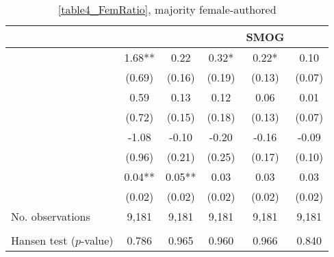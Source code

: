 \begin{table}
    \footnotesize
    \centering
    \begin{threeparttable}
        \caption{\autoref{table4_FemRatio}, majority female-authored}
        \label{table4_Fem50}
        \begin{tabular}{p{4cm}S@{}S@{}S@{}S@{}S@{}}
            \toprule
            &{}&{}&{}&{SMOG}&{}\\
            \midrule
            &        1.68** &        0.22   &        0.32*  &        0.22*  &        0.10   \\
                                          &      (0.69)   &      (0.16)   &      (0.19)   &      (0.13)   &      (0.07)   \\
            &        0.59   &        0.13   &        0.12   &        0.06   &        0.01   \\
                                          &      (0.72)   &      (0.15)   &      (0.18)   &      (0.13)   &      (0.07)   \\
            &       -1.08   &       -0.10   &       -0.20   &       -0.16   &       -0.09   \\
                                          &      (0.96)   &      (0.21)   &      (0.25)   &      (0.17)   &      (0.10)   \\
            &        0.04** &        0.05** &        0.03   &        0.03   &        0.03   \\
                                          &      (0.02)   &      (0.02)   &      (0.02)   &      (0.02)   &      (0.02)   \\
            \midrule
            No. observations     &       9,181   &       9,181   &       9,181   &       9,181   &       9,181   \\
             \\
            \quad Hansen test (\(p\)-value)&       0.786   &       0.965   &       0.960   &       0.966   &       0.840   \\

\end{tabular}
\end{threeparttable}
\end{table}
